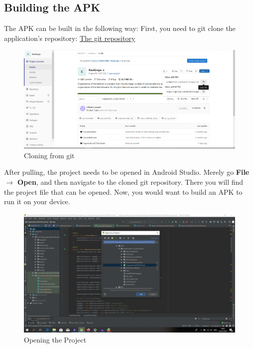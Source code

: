 			\subsection{Building the APK}
			
			The APK can be built in the following way:
			First, you need to git clone the application's repository: \href{https://gitlab.com/barbil/organization_of_the_festival}{The git repository}
			
			\begin{figure}[H]
				\includegraphics[width=\linewidth]{images/Deploy_M_1.png}
				\caption{Cloning from git}
				\label{fig:install_1}
			\end{figure}
			
			After pulling, the project needs to be opened in Android Studio. Merely go \textbf{File $\rightarrow$ Open}, and then navigate to the cloned git repository. There you will find the project file that can be opened. Now, you would want to build an APK to run it on your device.
			
			\begin{figure}[H]
				\includegraphics[width=\linewidth]{images/Deploy_M_2.png}
				\caption{Opening the Project}
				\label{fig:install_2}
			\end{figure}
			
